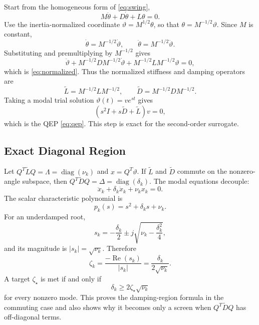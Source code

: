 \documentclass[journal]{IEEEtran}
\newcommand{\Lt}{\widetilde L}
\newcommand{\Dt}{\widetilde D}
\newcommand{\diag}{\operatorname{diag}}
\newcommand{\Real}{\operatorname{Re}}
\begin{document}
Start from the homogeneous form of \eqref{eq:swing},
\begin{equation}
M\ddot{\theta}+D\dot{\theta}+L\theta=0.
\end{equation}
Use the inertia-normalized coordinate $\vartheta=M^{1/2}\theta$, so that $\theta=M^{-1/2}\vartheta$. Since $M$ is constant,
\begin{equation}
\dot{\theta}=M^{-1/2}\dot{\vartheta},\qquad
\ddot{\theta}=M^{-1/2}\ddot{\vartheta}.
\end{equation}
Substituting and premultiplying by $M^{-1/2}$ gives
\begin{equation}
\ddot{\vartheta}
 +M^{-1/2}DM^{-1/2}\dot{\vartheta}
 +M^{-1/2}LM^{-1/2}\vartheta=0,
\end{equation}
which is \eqref{eq:normalized}. Thus the normalized stiffness and damping operators are
\begin{equation}
\Lt=M^{-1/2}LM^{-1/2},\qquad
\Dt=M^{-1/2}DM^{-1/2}.
\end{equation}
Taking a modal trial solution $\vartheta(t)=ve^{st}$ gives
\begin{equation}
\left(s^2I+s\Dt+\Lt\right)v=0,
\end{equation}
which is the QEP \eqref{eq:qep}. This step is exact for the second-order surrogate.

\subsection{Exact Diagonal Region}

Let $Q^T\Lt Q=\Lambda=\diag(\nu_k)$ and $x=Q^T\vartheta$. If $\Lt$ and $\Dt$ commute on the nonzero-angle subspace, then $Q^T\Dt Q=\Delta=\diag(\delta_k)$. The modal equations decouple:
\begin{equation}
\ddot{x}_k+\delta_k\dot{x}_k+\nu_kx_k=0.
\end{equation}
The scalar characteristic polynomial is
\begin{equation}
p_k(s)=s^2+\delta_ks+\nu_k.
\end{equation}
For an underdamped root,
\begin{equation}
s_k=-\frac{\delta_k}{2}\pm j\sqrt{\nu_k-\frac{\delta_k^2}{4}},
\end{equation}
and its magnitude is $|s_k|=\sqrt{\nu_k}$. Therefore
\begin{equation}
\zeta_k=\frac{-\Real(s_k)}{|s_k|}
=\frac{\delta_k}{2\sqrt{\nu_k}}.
\end{equation}
A target $\zeta_\star$ is met if and only if
\begin{equation}
\delta_k\geq 2\zeta_\star\sqrt{\nu_k}
\end{equation}
for every nonzero mode. This proves the damping-region formula in the commuting case and also shows why it becomes only a screen when $Q^T\Dt Q$ has off-diagonal terms.
\end{document}
